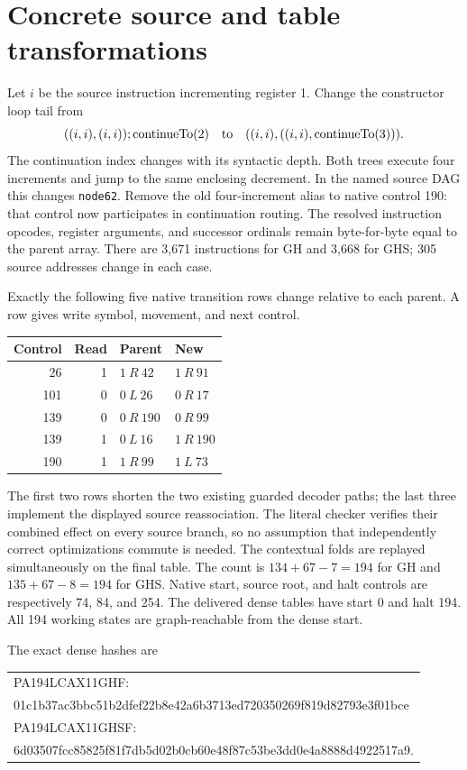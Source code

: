\section{Concrete source and table transformations}
Let $i$ be the source instruction incrementing register 1. Change the
constructor loop tail from
\[
 ((i,i),(i,i));\operatorname{continueTo}(2)
 \quad\hbox{to}\quad
 ((i,i),((i,i),\operatorname{continueTo}(3))).
\]
The continuation index changes with its syntactic depth. Both trees
execute four increments and jump to the same enclosing decrement.
In the named source DAG this changes \texttt{node62}. Remove the old
four-increment alias to native control 190: that control now participates
in continuation routing. The resolved instruction opcodes, register
arguments, and successor ordinals remain byte-for-byte equal to the
parent array. There are 3,671 instructions for GH and 3,668 for GHS;
305 source addresses change in each case.

Exactly the following five native transition rows change relative to
each parent. A row gives write symbol, movement, and next control.
\begin{center}
\begin{tabular}{rrll}
\toprule
Control & Read & Parent & New \\
\midrule
26 & 1 & $1\ R\ 42$ & $1\ R\ 91$ \\
101 & 0 & $0\ L\ 26$ & $0\ R\ 17$ \\
139 & 0 & $0\ R\ 190$ & $0\ R\ 99$ \\
139 & 1 & $0\ L\ 16$ & $1\ R\ 190$ \\
190 & 1 & $1\ R\ 99$ & $1\ L\ 73$ \\
\bottomrule
\end{tabular}
\end{center}
The first two rows shorten the two existing guarded decoder paths; the
last three implement the displayed source reassociation. The literal
checker verifies their combined effect on every source branch, so no
assumption that independently correct optimizations commute is needed.
The contextual folds are replayed simultaneously on the final table.
The count is $134+67-7=194$ for GH and $135+67-8=194$ for GHS.
Native start, source root, and halt controls are respectively 74, 84,
and 254. The delivered dense tables have start 0 and halt 194.
All 194 working states are graph-reachable from the dense start.

The exact dense hashes are
\begin{center}\small\ttfamily
\begin{tabular}{l}
PA194LCAX11GHF:\\
01c1b37ac3bbc51b2dfef22b8e42a6b3713ed720350269f819d82793e3f01bce\\[3pt]
PA194LCAX11GHSF:\\
6d03507fcc85825f81f7db5d02b0cb60e48f87c53be3dd0e4a8888d4922517a9.
\end{tabular}
\end{center}

